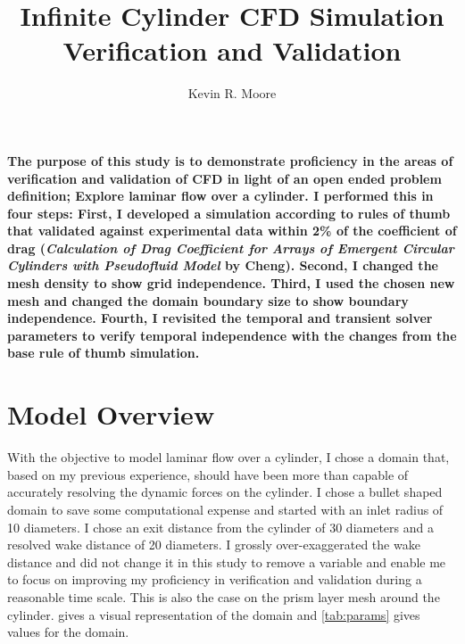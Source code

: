 \documentclass[10pt,english]{article}
\title{\vspace{-20pt}Infinite Cylinder CFD Simulation Verification and Validation}
\author{Kevin R. Moore}
\affil{\vspace{-10pt}Brigham Young University}
\date{}
\begin{document}
\maketitle
\vspace{-15pt}
   \textbf{The purpose of this study is to demonstrate proficiency in the areas of verification and validation of CFD in light of an open ended problem definition; Explore laminar flow over a cylinder.  I performed this in four steps: First, I developed a simulation according to rules of thumb that validated against experimental data within 2\% of the coefficient of drag (\textit{Calculation of Drag Coefficient for Arrays of Emergent Circular Cylinders with Pseudofluid Model} by Cheng).  Second, I changed the mesh density to show grid independence.  Third, I used the chosen new mesh and changed the domain boundary size to show boundary independence.  Fourth, I revisited the temporal and transient solver parameters to verify temporal independence with the changes from the base rule of thumb simulation. }

\vspace{0pt}

\section{Model Overview}

With the objective to model laminar flow over a cylinder, I chose a domain that, based on my previous experience, should have been more than capable of accurately resolving the dynamic forces on the cylinder.  I chose a bullet shaped domain to save some computational expense and started with an inlet radius of 10 diameters.  I chose an exit distance from the cylinder of 30 diameters and a resolved wake distance of 20 diameters.  I grossly over-exaggerated the wake distance and did not change it in this study to remove a variable and enable me to focus on improving my proficiency in verification and validation during a reasonable time scale.  This is also the case on the prism layer mesh around the cylinder.   gives a visual representation of the domain and \cref{tab:params} gives values for the domain.


\end{document}
